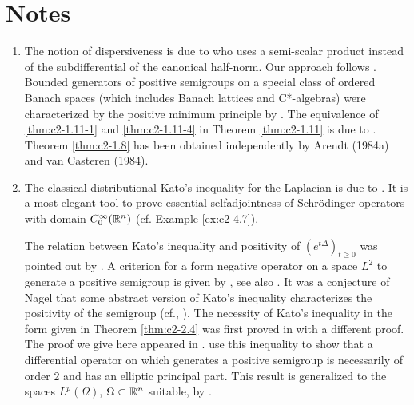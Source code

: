 \section*{Notes}

\begin{enumerate}[label=\emph{Section \arabic*:}, wide]

\item   The notion of dispersiveness is due to \citet{phillips:1962} who uses a semi-scalar product instead of the subdifferential of the canonical half-norm.
Our approach follows \citet{arendtchernoffkato:1982}.
Bounded generators of positive semigroups on a special class of ordered Banach spaces (which includes Banach lattices and C*-algebras) were characterized by the positive minimum principle by \citet{evansandhancheolsen:1979}.
The equivalence of \ref{thm:c2-1.11-1} and \ref{thm:c2-1.11-4}  in Theorem \ref{thm:c2-1.11}  is due to \citet{nageluhlig:1981}.
Theorem \ref{thm:c2-1.8}   has been obtained independently by Arendt (1984a) and van Casteren (1984).

\smallskip
\item  
The classical distributional Kato's inequality for the Laplacian is due to \citet{kato:1973}.
It is a most elegant tool to prove essential selfadjointness of Schrödinger operators with domain $C^{\infty}_0(\mathbb{R}^n)$ (cf. Example \ref{ex:c2-4.7}).

The relation between Kato's inequality and positivity of $(e^{t\Delta})_{t \geq 0}$ was pointed out by \citet{simon:1977}.
A criterion for a form negative operator on a space $L^2$ to generate a positive semigroup is given by \citet{beurlingdeny:1958}, see also \citet[Vol. IV, Section XIII.12]{reedsimon:1978}.
It was a conjecture of Nagel that some abstract version of
Kato's inequality characterizes the positivity of the semigroup (cf., \citet{nageluhlig:1981}). The necessity of Kato's inequality in the form given in Theorem \ref{thm:c2-2.4}   was first proved in \citet[Remark 3.10]{arendt:1982} with a different proof. 
The proof we give here appeared in \citet{arendt:1984}. 
\citet{miyajimaokazawa:1984} use this inequality to show that a differential operator on which generates a positive semigroup is necessarily of order 2 and has an elliptic principal part. 
This result is generalized to the spaces $L^p(\Omega)$, $\Omega \subset \mathbb{R}^n$ suitable, by \citet{miyajima:1986}.


\end{enumerate}
